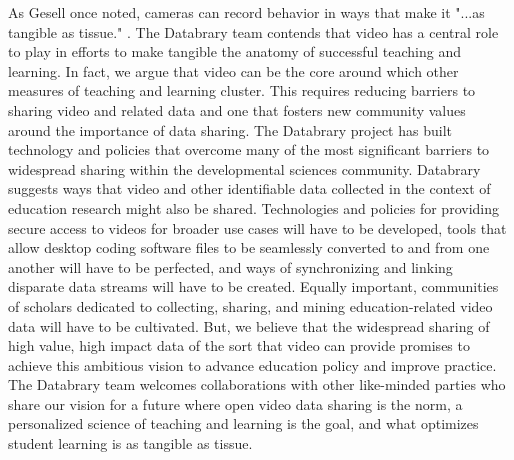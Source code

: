 \documentclass[letterpaper,man,apacite]{apa6}
\begin{document}
As Gesell once noted, cameras can record behavior in ways that make it "...as tangible as tissue." \cite{Scott2011}.
The Databrary team contends that video has a central role to play in efforts to make tangible the anatomy of successful teaching and learning.
In fact, we argue that video can be the core around which other measures of teaching and learning cluster.
This requires reducing barriers to sharing video and related data and one that fosters new community values around the importance of data sharing.
The Databrary project has built technology and policies that overcome many of the most significant barriers to widespread sharing within the developmental sciences community. 
Databrary suggests ways that video and other identifiable data collected in the context of education research might also be shared.
Technologies and policies for providing secure access to videos for broader use cases will have to be developed,  tools that allow desktop coding software files to be seamlessly converted to and from one another will have to be perfected, and ways of synchronizing and linking disparate data streams will have to be created.
Equally important, communities of scholars dedicated to collecting, sharing, and mining education-related video data will have to be cultivated.
But, we believe that the widespread sharing of high value, high impact data of the sort that video can provide promises to achieve this ambitious vision to advance education policy and improve practice.
The Databrary team welcomes collaborations with other like-minded parties who share our vision \cite{Adolph2012} for a future where open video data sharing is the norm, a personalized science of teaching and learning is the goal, and what optimizes student learning is as tangible as tissue.


\end{document}
